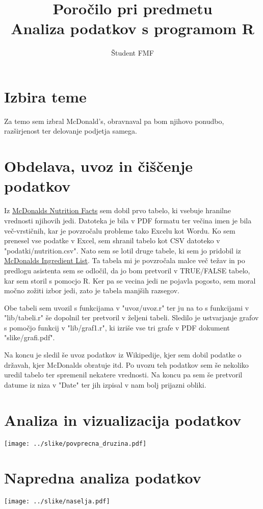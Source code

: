\documentclass[11pt,a4paper]{article}
\begin{document}
\title{Poročilo pri predmetu \\
Analiza podatkov s programom R}
\author{Študent FMF}
\maketitle

\section{Izbira teme}

Za temo sem izbral McDonald's, obravnaval pa bom njihovo ponudbo, razširjenost ter delovanje podjetja samega.

\section{Obdelava, uvoz in čiščenje podatkov}

Iz \href{http://nutrition.mcdonalds.com/getnutrition/nutritionfacts.pdf}{McDonalds Nutrition Facts} sem dobil prvo tabelo, ki vsebuje hranilne vrednosti njihovih jedi. Datoteka je bila v PDF formatu ter večina imen je bila več-vrstičnih, kar je povzročalu probleme tako Excelu kot Wordu. Ko sem prenesel vse podatke v Excel, sem shranil tabelo kot CSV datoteko v "podatki/nutrition.csv". Nato sem se lotil druge tabele, ki sem jo pridobil iz \href{http://nutrition.mcdonalds.com/getnutrition/ingredientslist.pdf}{McDonalds Ingredient List}. Ta tabela mi je povzročala malce več težav in po predlogu asistenta sem se odločil, da jo bom pretvoril v TRUE/FALSE tabelo, kar sem storil s pomocjo R. Ker pa se vecina jedi ne pojavla pogosto, sem moral močno zožiti izbor jedi, zato je tabela manjših razsegov. \par

Obe tabeli sem uvozil s funkcijama v "uvoz/uvoz.r" ter ju na to s funkcijami v "lib/tabeli.r" še dopolnil ter pretvoril v željeni tabeli. Sledilo je ustvarjanje grafov s pomočjo funkcij v "lib/graf1.r", ki izriše vse tri grafe v PDF dokument "slike/grafi.pdf". \par

Na koncu je sledil še uvoz podatkov iz Wikipedije, kjer sem dobil podatke o državah, kjer McDonalds obratuje itd. Po uvozu teh podatkov sem še nekoliko uredil tabelo ter spremenil nekatere vrednosti. Na koncu pa sem še pretvoril datume iz niza v "Date" ter jih izpisal v nam bolj prijazni obliki.

\section{Analiza in vizualizacija podatkov}

\texttt{[image: ../slike/povprecna\_druzina.pdf]}

\section{Napredna analiza podatkov}

\texttt{[image: ../slike/naselja.pdf]}
\end{document}
